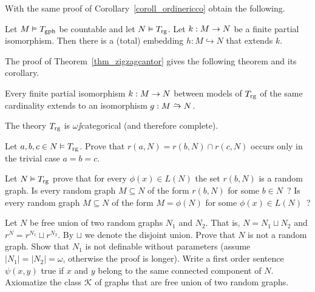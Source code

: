 \documentclass[creche.tex]{subfiles}
\begin{document}
With the same proof of Corollary~\ref{coroll_ordinericco} obtain the following.

\begin{corollary}\label{coroll_graforicco}
Let $M\models T_{\rm gph}$ be countable and let $N\models T_{\rm rg}$.
Let $k:M\imp N$ be a finite partial isomorphism.
Then there is a (total) embedding $h:M\hookrightarrow N$ that extends $k$.\QED
\end{corollary}

The proof of Theorem~\ref{thm_zigzagcantor} gives the following theorem and its corollary.

\begin{theorem}\label{gaomegacat}
Every finite partial isomorphism $k:M\imp N$ between models of $T_{\rm rg}$ of the same cardinality extends to an isomorphism $g:M\isomap N$.\QED
\end{theorem}

\begin{corollary}
The theory $T_{\rm rg}$ is $\omega\jj$categorical (and therefore complete).\QED
\end{corollary}

\begin{exercise}
Let $a,b,c\in N\models T_{\rm rg}$.
Prove that $r(a,N)=r(b,N)\cap r(c,N)$ occurs only in the trivial case $a=b=c$.\QED
\end{exercise}

\begin{exercise}
Let $N\models T_{\rm rg}$ prove that for every $\phi(x)\in L(N)$ the set $r(b,N)$ is a random graph.
Is every random graph $M\subseteq N$ of the form $r(b,N)$ for some $b\in N$~? Is every random graph $M\subseteq N$ of the form $M=\phi(N)$ for some $\phi(x)\in L(N)$~?\QED
\end{exercise}


\begin{exercise}\label{unionedisgiunta}
Let $N$ be free union of two random graphs $N_1$ and $N_2$.
That is, $N=N_1\sqcup N_2$ and $r^N= r^{N_1}\sqcup r^{N_2}$.
By $\sqcup$ we denote the disjoint union.
Prove that $N$ is not a random graph.
Show that $N_1$ is not definable without parameters (assume $|N_1|=|N_2|=\omega$, otherwise the proof is longer).
Write a first order sentence $\psi(x,y)$ true if $x$ and $y$ belong to the same connected component of $N$.
Axiomatize the class $\K$ of graphs that are free union of two random graphs.\QED
\end{exercise}
\end{document}
